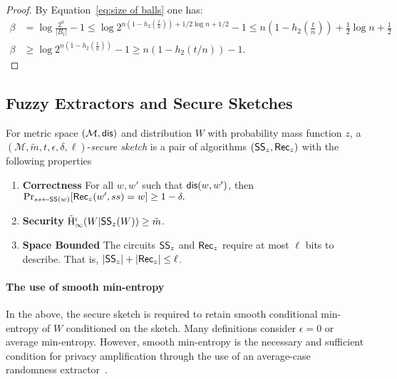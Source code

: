 \begin{proof}
By Equation~\ref{eq:size of balls} one has: 
\begin{align*}
\beta & = \log{\frac{2^n}{|B_t|} -1} \le \log{2^{n\left(1-h_2\left(\frac{t}{n}\right)\right) + 1/2 \log{n}+1/2} -1} \le n\left(1-h_2\left(\frac{t}{n}\right)\right) + \frac{1}{2}\log{n}+ \frac{1}{2}\\
\beta&\ge \log{2^{n\left(1-h_2\left(\frac{t}{n}\right)\right)} -1} \ge n(1-h_2(t/n))-1.
\end{align*}
\end{proof}


    \subsection{Fuzzy Extractors and Secure Sketches}
\begin{definition}
For metric space $(\mathcal{M}, \mathsf{dis})$ and distribution $W$ with probability mass function $z$, a $(\mathcal{M}, \tilde{m}, t, \epsilon, \delta, \ell)$-\emph{secure sketch} is a pair of algorithms $({\mathsf{SS}}_z, {\mathsf{Rec}}_z)$ with the following properties 
\begin{enumerate} 
\itemsep0em
\item \textbf{Correctness} For all $w, w'$ such that $\mathsf{dis}(w, w')$, then $\Pr_{ss \leftarrow {\ensuremath{\mathsf{SS}}}(w)}[{\mathsf{Rec}}_z(w', ss) = w]\ge 1-\delta.$
\item \textbf{Security}  $\tilde{\mathrm{H}}_\infty^\epsilon(W | {\mathsf{SS}}_z(W)) \ge \tilde{m}$.
\item \textbf{Space Bounded} The circuits ${\mathsf{SS}}_z$ and ${\mathsf{Rec}}_z$ require at most $\ell$ bits to describe.  That is, $|{\mathsf{SS}}_z| +|{\mathsf{Rec}}_z|\le \ell$.
\end{enumerate}
\end{definition}

\paragraph{The use of smooth min-entropy} In the above, the secure sketch is required to retain smooth conditional min-entropy of $W$ conditioned on the sketch.  Many definitions consider $\epsilon=0$ or average min-entropy.  However, smooth min-entropy is the necessary and sufficient condition for privacy amplification through the use of an average-case randomness extractor~\cite{renner2005simple}.

